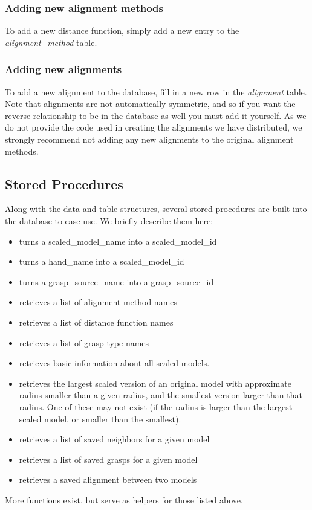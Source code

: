 \subsubsection{Adding new alignment methods}
To add a new distance function, simply add a new entry to the
\emph{alignment\_method} table.

\subsubsection{Adding new alignments}
To add a new alignment to the database, fill in a new row in the
\emph{alignment} table. Note that alignments are not automatically
symmetric, and so if you want the reverse relationship to be in the
database as well you must add it yourself. As we do not provide the
code used in creating the alignments we have distributed, we strongly
recommend not adding any new alignments to the original alignment
methods.


\subsection{Stored Procedures}
Along with the data and table structures, several stored procedures
are built into the database to ease use. We briefly describe them
here:

\begin{itemize}
	\item {} turns a scaled\_model\_name into a
      scaled\_model\_id
	\item {} turns a hand\_name into a scaled\_model\_id
	\item {} turns a grasp\_source\_name into a
      grasp\_source\_id
	\item {} retrieves a list of
      alignment method names
	\item {} retrieves a list of
      distance function names
	\item {} retrieves a list of grasp type names
	\item {} retrieves basic information about all
      scaled models.
	\item {} retrieves the largest
      scaled version of an original model with approximate radius
      smaller than a given radius, and the smallest version larger
      than that radius. One of these may not exist (if the radius is
      larger than the largest scaled model, or smaller than the
      smallest).
	\item {} retrieves a list of saved
      neighbors for a given model
	\item {} retrieves a list of saved grasps for a
      given model
	\item {} retrieves a saved alignment between
      two models
\end{itemize}

More functions exist, but serve as helpers for those listed above.
